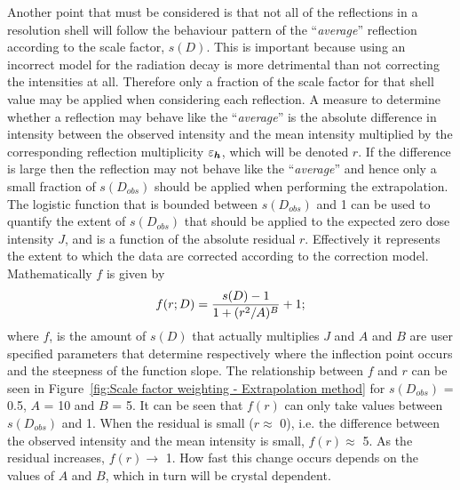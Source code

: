 Another point that must be considered is that not all of the reflections in a resolution shell will follow the behaviour pattern of the ``\textit{average}'' reflection according to the scale factor, $s(D)$.
This is important because using an incorrect model for the radiation decay is more detrimental than not correcting the intensities at all.
Therefore only a fraction of the scale factor for that shell value may be applied when considering each reflection.
A measure to determine whether a reflection may behave like the ``\textit{average}'' is the absolute difference in intensity between the observed intensity and the mean intensity multiplied by the corresponding reflection multiplicity $\varepsilon_{\boldsymbol{h}}$, which will be denoted $r$.
If the difference is large then the reflection may not behave like the ``\textit{average}'' and hence only a small fraction of $s(D_{obs})$ should be applied when performing the extrapolation.
The logistic function that is bounded between $s(D_{obs})$ and 1 can be used to quantify the extent of $s(D_{obs})$ that should be applied to the expected zero dose intensity $J$, and is a function of the absolute residual $r$.
Effectively it represents the extent to which the data are corrected according to the correction model.
Mathematically $f$ is given by
\begin{equation}
f(r; D) = \frac{s(D) - 1}{1 + (r^2/A)^B} + 1;
\label{eq:Fraction of scale factor to be applied - Extrapolation method}
\end{equation}
where $f$, is the amount of $s(D)$ that actually multiplies $J$ and $A$ and $B$ are user specified parameters that determine respectively where the inflection point occurs and the steepness of the function slope.
The relationship between $f$ and $r$ can be seen in Figure~\ref{fig:Scale factor weighting - Extrapolation method} for $s(D_{obs})$ = 0.5, $A$ = 10 and $B$ = 5.
It can be seen that $f(r)$ can only take values between $s(D_{obs})$ and 1.
When the residual is small ($r \approx$ 0), i.e. the difference between the observed intensity and the mean intensity is small, $f(r) \approx$ 5.
As the residual increases, $f(r) \rightarrow$ 1.
How fast this change occurs depends on the values of $A$ and $B$, which in turn will be crystal dependent.
